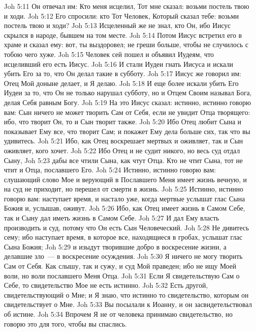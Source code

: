 \vs Joh 5:11 Он отвечал им: Кто меня исцелил, Тот мне сказал: возьми постель твою и ходи.
\vs Joh 5:12 Его спросили: кто Тот Человек, Который сказал тебе: возьми постель твою и ходи?
\vs Joh 5:13 Исцеленный же не знал, кто Он, ибо Иисус скрылся в народе, бывшем на том месте.
\vs Joh 5:14 Потом Иисус встретил его в храме и сказал ему: вот, ты выздоровел; не греши больше, чтобы не случилось с тобою чего хуже.
\vs Joh 5:15 Человек сей пошел и объявил Иудеям, что исцеливший его есть Иисус.
\vs Joh 5:16 И стали Иудеи гнать Иисуса и искали убить Его за то, что Он делал такие  в субботу.
\rsbpar\vs Joh 5:17 Иисус же говорил им: Отец Мой доныне делает, и Я делаю.
\vs Joh 5:18 И еще более искали убить Его Иудеи за то, что Он не только нарушал субботу, но и Отцем Своим называл Бога, делая Себя равным Богу.
\vs Joh 5:19 На это Иисус сказал: истинно, истинно говорю вам: Сын ничего не может творить Сам от Себя, если не увидит Отца творящего: ибо, что творит Он, то и Сын творит также.
\vs Joh 5:20 Ибо Отец любит Сына и показывает Ему все, что творит Сам; и покажет Ему дела больше сих, так что вы удивитесь.
\vs Joh 5:21 Ибо, как Отец воскрешает мертвых и оживляет, так и Сын оживляет, кого хочет.
\vs Joh 5:22 Ибо Отец и не судит никого, но весь суд отдал Сыну,
\vs Joh 5:23 дабы все чтили Сына, как чтут Отца. Кто не чтит Сына, тот не чтит и Отца, пославшего Его.
\vs Joh 5:24 Истинно, истинно говорю вам: слушающий слово Мое и верующий в Пославшего Меня имеет жизнь вечную, и на суд не приходит, но перешел от смерти в жизнь.
\vs Joh 5:25 Истинно, истинно говорю вам: наступает время, и настало уже, когда мертвые услышат глас Сына Божия и, услышав, оживут.
\vs Joh 5:26 Ибо, как Отец имеет жизнь в Самом Себе, так и Сыну дал иметь жизнь в Самом Себе.
\vs Joh 5:27 И дал Ему власть производить и суд, потому что Он есть Сын Человеческий.
\vs Joh 5:28 Не дивитесь сему; ибо наступает время, в которое все, находящиеся в гробах, услышат глас Сына Божия;
\vs Joh 5:29 и изыдут творившие добро в воскресение жизни, а делавшие зло~--- в воскресение осуждения.
\vs Joh 5:30 Я ничего не могу творить Сам от Себя. Как слышу, так и сужу, и суд Мой праведен; ибо не ищу Моей воли, но воли пославшего Меня Отца.
\vs Joh 5:31 Если Я свидетельствую Сам о Себе, то свидетельство Мое не есть истинно.
\vs Joh 5:32 Есть другой, свидетельствующий о Мне; и Я знаю, что истинно то свидетельство, которым он свидетельствует о Мне.
\vs Joh 5:33 Вы посылали к Иоанну, и он засвидетельствовал об истине.
\vs Joh 5:34 Впрочем Я не от человека принимаю свидетельство, но говорю это для того, чтобы вы спаслись.
